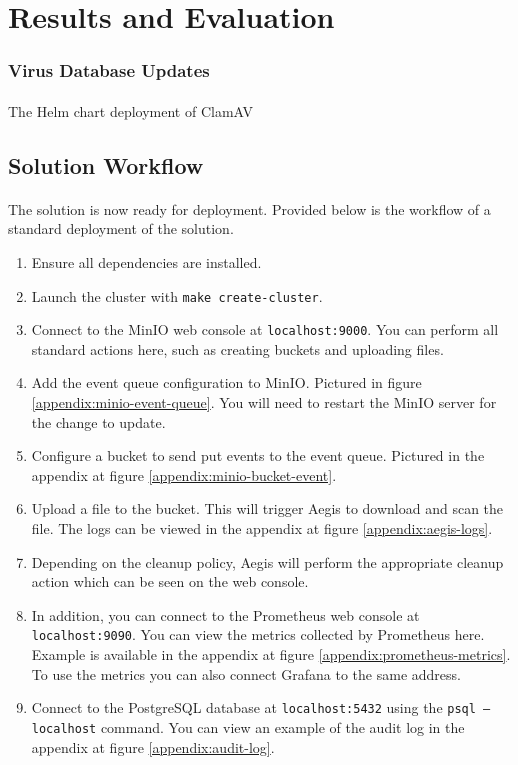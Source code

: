 \documentclass[12pt, conference, final, a4paper, onecolumn, compsoc]{IEEEtran}
\begin{document}
\section{Results and Evaluation}

\subsubsection*{Virus Database Updates}
\paragraph{}
The Helm chart deployment of ClamAV

\subsection{Solution Workflow}
\paragraph{}
The solution is now ready for deployment. Provided below is the workflow of a
standard deployment of the solution.

\begin{enumerate}
  \item Ensure all dependencies are installed.
  \item Launch the cluster with \texttt{make create-cluster}.
  \item Connect to the MinIO web console at \texttt{localhost:9000}. You can
        perform all standard actions here, such as creating buckets and
        uploading files.
  \item Add the event queue configuration to MinIO. Pictured in figure
        \ref{appendix:minio-event-queue}. You will need to restart the MinIO
        server for the change to update.
  \item Configure a bucket to send put events to the event queue. Pictured in
        the appendix at figure \ref{appendix:minio-bucket-event}.
  \item Upload a file to the bucket. This will trigger Aegis to download and
        scan the file. The logs can be viewed in the appendix at figure
        \ref{appendix:aegis-logs}.
  \item Depending on the cleanup policy, Aegis will perform the appropriate
        cleanup action which can be seen on the web console.
  \item In addition, you can connect to the Prometheus web console at
        \texttt{localhost:9090}. You can view the metrics collected by
        Prometheus here. Example is available in the appendix at figure
        \ref{appendix:prometheus-metrics}. To use the metrics you can also
        connect Grafana to the same address.
  \item Connect to the PostgreSQL database at \texttt{localhost:5432} using the
        \texttt{psql --localhost} command. You can view an example of the audit
        log in the appendix at figure \ref{appendix:audit-log}.
\end{enumerate}
\end{document}
